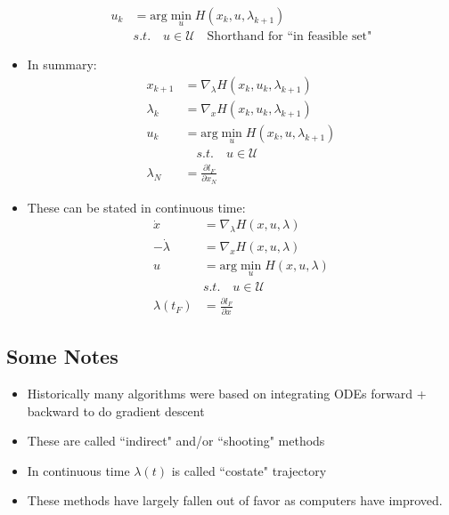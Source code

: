 \documentclass[11pt]{article}
\begin{document}
\begin{itemize}
     \begin{align*}
         u_k &= \text{arg}\min_u H(x_k, u, \lambda_{k+1})
         \\
        & s.t. \quad u \in \mathcal{U} \quad\text{Shorthand for ``in feasible set"}
     \end{align*}
     \item In summary:
     \begin{align*}
         x_{k+1} &= \nabla_\lambda H(x_k,u_k,\lambda_{k+1})
         \\
         \lambda_k &= \nabla_x H(x_k,u_k,\lambda_{k+1})
         \\
         u_k &= \text{arg}\min_u H(x_k, u,\lambda_{k+1})
         \\
         &\quad s.t. \quad u\in \mathcal{U}
         \\
         \lambda_N &= \frac{\partial l_F}{\partial x_N}
     \end{align*}
     \item These can be stated in continuous time:
     \begin{align*}
         \dot{x} &= \nabla_\lambda H(x,u,\lambda)
         \\
         -\dot{\lambda} &= \nabla_xH(x,u,\lambda)
         \\
         u &= \text{arg}\min_u H(x,u,\lambda)
         \\
         \quad &s.t. \quad u \in \mathcal{U}
         \\
         \lambda(t_F) &= \frac{\partial l_F}{\partial x}
     \end{align*}
\end{itemize}

\subsection{Some Notes}
\begin{itemize}
    \item Historically many algorithms were based on integrating ODEs forward + backward to do gradient descent
    \item These are called ``indirect" and/or ``shooting" methods
    \item In continuous time $\lambda(t)$ is called ``costate" trajectory
    \item These methods have largely fallen out of favor as computers have improved.
\end{itemize}
\end{document}
